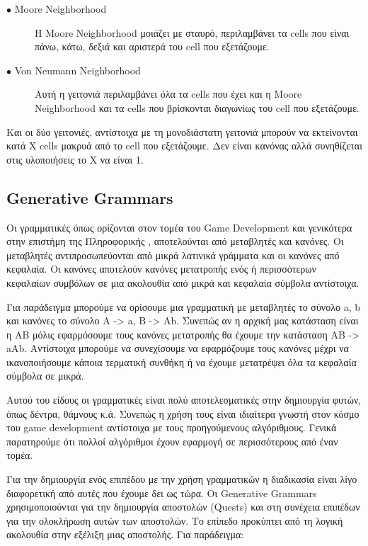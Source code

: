 \begin{description}
  \item[$\bullet$ Moore Neighborhood] Η Moore Neighborhood μοιάζει με σταυρό, περιλαμβάνει τα cells που είναι πάνω, κάτω, δεξιά και αριστερά του cell που εξετάζουμε. 
    \item[$\bullet$ Von Neumann Neighborhood] Αυτή η γειτονιά περιλαμβάνει όλα τα cells που έχει και η Moore Neighborhood και τα cells που βρίσκονται διαγωνίως του cell που εξετάζουμε.
\end{description}
Και οι δύο γειτονιές, αντίστοιχα με τη μονοδιάστατη γειτονιά μπορούν να εκτείνονται κατά X cells μακρυά από το cell που εξετάζουμε. Δεν είναι κανόνας αλλά συνηθίζεται στις υλοποιήσεις το X να είναι 1.

\subsection{Generative Grammars}
Οι γραμματικές όπως ορίζονται στον τομέα του Game Development και γενικότερα στην επιστήμη της Πληροφορικής \cite{grammars}, αποτελούνται από μεταβλητές και κανόνες. Οι μεταβλητές αντιπροσωπεύονται από μικρά λατινικά γράμματα και οι κανόνες από κεφαλαία. Οι κανόνες αποτελούν κανόνες μετατροπής ενός ή περισσότερων κεφαλαίων συμβόλων σε μια ακολουθία από μικρά και κεφαλαία σύμβολα αντίστοιχα.
\par 
Για παράδειγμα μπορούμε να ορίσουμε μια γραμματική με μεταβλητές το σύνολο {a, b} και κανόνες το σύνολο {Α -> a, B -> Ab}. Συνεπώς αν η αρχική μας κατάσταση είναι η {ΑΒ} μόλις εφαρμόσουμε τους κανόνες μετατροπής θα έχουμε την κατάσταση {ΑΒ} -> {aΑb}. Αντίστοιχα μπορούμε να συνεχίσουμε να εφαρμόζουμε τους κανόνες μέχρι να ικανοποιήσουμε κάποια τερματική συνθήκη ή να έχουμε μετατρέψει όλα τα κεφαλαία σύμβολα σε μικρά.
\par
Αυτού του είδους οι γραμματικές είναι πολύ αποτελεσματικές στην δημιουργία φυτών, όπως δέντρα, θάμνους κ.ά. Συνεπώς η χρήση τους είναι ιδιαίτερα γνωστή στον κόσμο του game development αντίστοιχα με τους προηγούμενους αλγόριθμους. Γενικά παρατηρούμε ότι πολλοί αλγόριθμοι έχουν εφαρμογή σε περισσότερους από έναν τομέα.
\par
Για την δημιουργία ενός επιπέδου με την χρήση γραμματικών η διαδικασία είναι λίγο διαφορετική από αυτές που έχουμε δει ως τώρα. Οι Generative Grammars χρησιμοποιούνται για την δημιουργία αποστολών (Quests) και στη συνέχεια επιπέδων για την ολοκλήρωση αυτών των αποστολών. Το επίπεδο προκύπτει από τη λογική ακολουθία στην εξέλιξη μιας αποστολής. Για παράδειγμα:
